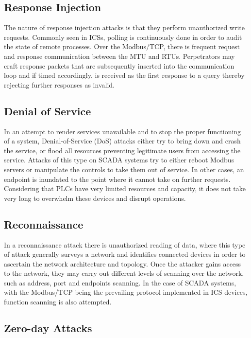 \documentclass[11pt,]{article}
\begin{document}
\subsection{Response Injection}\label{response-injection}

The nature of response injection attacks is that they perform
unauthorized write requests. Commonly seen in ICSs, polling is
continuously done in order to audit the state of remote processes. Over
the Modbus/TCP, there is frequent request and response communication
between the MTU and RTUs. Perpetrators may craft response packets that
are subsequently inserted into the communication loop and if timed
accordingly, is received as the first response to a query thereby
rejecting further responses as invalid.

\subsection{Denial of Service}\label{denial-of-service}

In an attempt to render services unavailable and to stop the proper
functioning of a system, Denial-of-Service (DoS) attacks either try to
bring down and crash the service, or flood all resources preventing
legitimate users from accessing the service. Attacks of this type on
SCADA systems try to either reboot Modbus servers or manipulate the
controls to take them out of service. In other cases, an endpoint is
inundated to the point where it cannot take on further requests.
Considering that PLCs have very limited resources and capacity, it does
not take very long to overwhelm these devices and disrupt operations.

\subsection{Reconnaissance}\label{reconnaissance}

In a reconnaissance attack there is unauthorized reading of data, where
this type of attack generally surveys a network and identifies connected
devices in order to ascertain the network architecture and topology.
Once the attacker gains access to the network, they may carry out
different levels of scanning over the network, such as address, port and
endpoints scanning. In the case of SCADA systems, with the Modbus/TCP
being the prevailing protocol implemented in ICS devices, function
scanning is also attempted.

\subsection{Zero-day Attacks}\label{zero-day-attacks}
\end{document}
